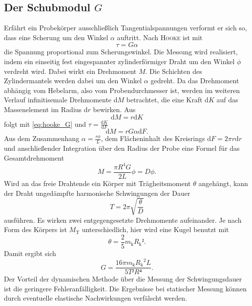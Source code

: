 \subsection{Der Schubmodul \texorpdfstring{$G$}{G}}
Erfährt ein Probekörper ausschließlich Tangentialspannungen verformt er sich so, dass eine Scherung um den Winkel $\alpha$ auftritt. Nach \textsc{Hooke} ist mit
\begin{equation}
\tau=G\alpha
\label{eq:hooke_G}
\end{equation}
 die Spannung proportional zum Scherungswinkel. 
Die Messung wird realisiert, indem ein einseitig fest eingespannter zylinderförmiger Draht um den Winkel $\phi$ verdreht wird. Dabei wirkt ein Drehmoment $M$. Die Schichten des Zylindermantels werden dabei um den Winkel $\alpha$ gedreht. 
Da das Drehmoment abhängig vom Hebelarm, also vom Probendurchmesser ist, werden im weiteren Verlauf infinitisemale Drehmomente d$M$ betrachtet, die eine Kraft d$K$ auf das Massenelement im Radius d$r$ bewirken.
Aus
\begin{equation}
\mathup{d}M=r\mathup{d}K
\end{equation}
folgt mit \eqref{eq:hooke_G} und $\tau=\frac{\mathup{d}K}{\mathup{d}F}$
\begin{equation}
\mathup{d}M=rG\alpha\mathup{d}F.
\end{equation}
Aus dem Zusammenhang $\alpha=\frac{r\phi}{L}$, dem Flächeninhalt des Kreisrings $\mathup{d}F=2\pi r\mathup{d}r$ und anschließender Integration über den Radius der Probe eine Formel für das Gesamtdrehmoment
\begin{equation}
M=\frac{\pi R^4 G}{2L}\phi=D\phi.
\label{eq:Richtgrosse}
\end{equation}
Wird an das freie Drahtende ein Körper mit Trägheitsmoment $\theta$ angehängt, kann der Draht ungedämpfte harmonische Schwingungen der Dauer 
\begin{equation}
T=2\pi\sqrt{\frac{\theta}{D}}
\label{eq:t}
\end{equation}
 ausführen. Es wirken zwei entgegengesetzte Drehmomente aufeinander. Je nach Form des Körpers ist $M_\mathup{T}$ unterschiedlich, hier wird eine Kugel benutzt mit 
\begin{equation}
\theta=\frac{2}{5}m_\mathup{k}{R_\mathup{k}}².
\label{eq:theta_k}
\end{equation}
 Damit ergibt sich 
\begin{equation}
G=\frac{16\pi m_\mathup{k} {R_\mathup{k}}^2 L}{5T²R⁴}.
\label{eq:G}
\end{equation}
Der Vorteil der dynamischen Methode über die Messung der Schwingungsdauer ist die geringere Fehleranfälligkeit. Die Ergebnisse bei statischer Messung können durch eventuelle elastische Nachwirkungen verfälscht werden.

